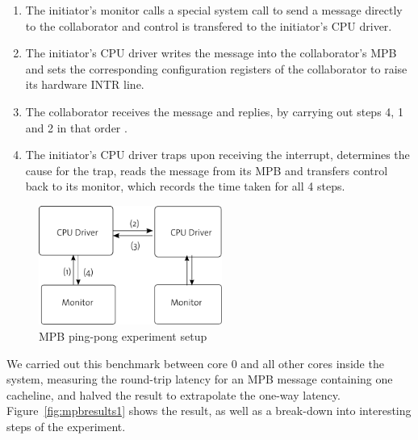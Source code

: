 \documentclass[a4paper,twoside]{report} %
\begin{document}
\begin{enumerate}
\item The initiator's monitor calls a special system call to send a
  message directly to the collaborator and control is transfered to the
  initiator's CPU driver.

\item The initiator's CPU driver writes the message into the collaborator's
  MPB and sets the corresponding configuration registers of the collaborator
  to raise its hardware INTR line.

\item The collaborator receives the message and replies, by carrying out
  steps 4, 1 and 2 in that order .

\item The initiator's CPU driver traps upon receiving the interrupt,
  determines the cause for the trap, reads the message from its MPB
  and transfers control back to its monitor, which records the time
  taken for all 4 steps.
\end{enumerate}

\begin{figure}
  \centering
  \includegraphics[width=6cm]{figures/exp1}
  \caption{MPB ping-pong experiment setup}
  \label{fig:mpbbench}
\end{figure}


We carried out this benchmark between core 0 and all other cores
inside the system, measuring the round-trip latency for an MPB
message containing one cacheline, and halved the result to extrapolate
the one-way latency. Figure~\ref{fig:mpbresults1} shows the result, as
well as a break-down into interesting steps of the experiment.
\end{document}
